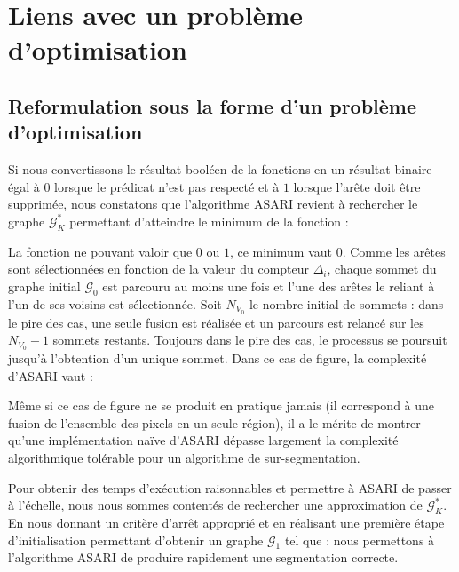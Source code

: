 \section{Liens avec un problème d'optimisation}

\subsection{Reformulation sous la forme d'un problème d'optimisation}
Si nous convertissons le résultat booléen de la fonctions  en un résultat binaire égal à $0$ lorsque le prédicat n'est pas respecté et à $1$ lorsque l'arête doit être supprimée, nous constatons que l'algorithme ASARI revient à rechercher le graphe $\mathcal{G}_{K}^{*}$ permettant d'atteindre le minimum de la fonction :

La fonction   ne pouvant valoir que $0$ ou $1$, ce minimum vaut $0$. Comme les arêtes sont sélectionnées en fonction de la valeur du compteur $\Delta_{i}$, chaque sommet du graphe initial $\mathcal{G}_{0}$ est parcouru au moins une fois et l'une des arêtes le reliant à l'un de ses voisins est sélectionnée. Soit $N_{V_{0}}$ le nombre initial de sommets : dans le pire des cas, une seule fusion est réalisée et un parcours est relancé sur les $N_{V_{0}}-1$ sommets restants. Toujours dans le pire des cas, le processus se poursuit jusqu'à l'obtention d'un unique sommet. Dans ce cas de figure, la complexité d'ASARI vaut :

Même si ce cas de figure ne se produit en pratique jamais (il correspond à une fusion de l'ensemble des pixels en un seule région), il a le mérite de montrer qu'une implémentation naïve d'ASARI dépasse largement la complexité algorithmique tolérable pour un algorithme de sur-segmentation. 

Pour obtenir des temps d'exécution raisonnables et permettre à ASARI de passer à l'échelle, nous nous sommes contentés de rechercher une approximation de $\mathcal{G}_{K}^{*}$. En nous donnant un critère d'arrêt approprié et en réalisant une première étape d'initialisation permettant d'obtenir un graphe $\mathcal{G}_{1}$ tel que :
nous permettons à l'algorithme ASARI de produire rapidement une segmentation correcte.

